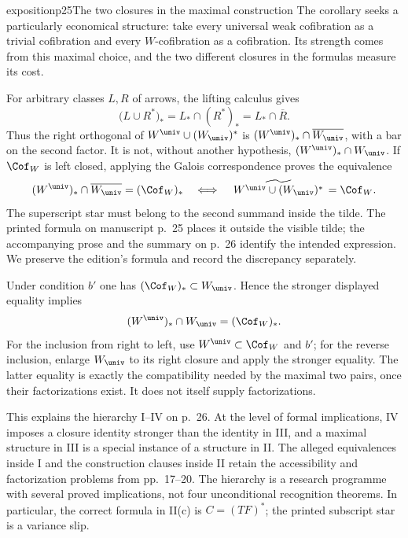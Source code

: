 \begin{dcomment}{exposition}{p25}{The two closures in the maximal construction}
The corollary seeks a particularly economical structure: take every universal weak cofibration as a trivial cofibration and every $W$-cofibration as a cofibration. Its strength comes from this maximal choice, and the two different closures in the formulas measure its cost.

For arbitrary classes $L,R$ of arrows, the lifting calculus gives
\[
 \bigl(L\cup R^*\bigr)_*=L_*\cap(R^*)_*
       =L_*\cap\overline R.
\]
Thus the right orthogonal of $W^{\univ}\cup(W_{\univ})^*$ is
$(W^{\univ})_*\cap\overline{W_{\univ}}$, with a bar on the second factor. It is not, without another hypothesis, $(W^{\univ})_*\cap W_{\univ}$. If $\Cof_W$ is left closed, applying the Galois correspondence proves the equivalence
\[
 (W^{\univ})_*\cap\overline{W_{\univ}}=(\Cof_W)_*
 \quad\Longleftrightarrow\quad
 \widetilde{\,W^{\univ}\cup(W_{\univ})^*\,}=\Cof_W.
\]
The superscript star must belong to the second summand inside the tilde. The printed formula on manuscript p.~25 places it outside the visible tilde; the accompanying prose and the summary on p.~26 identify the intended expression. We preserve the edition's formula and record the discrepancy separately.

Under condition $b'$ one has $(\Cof_W)_*\subset W_{\univ}$. Hence the stronger displayed equality implies
\[
 (W^{\univ})_*\cap W_{\univ}=(\Cof_W)_*.
\]
For the inclusion from right to left, use $W^{\univ}\subset\Cof_W$ and $b'$; for the reverse inclusion, enlarge $W_{\univ}$ to its right closure and apply the stronger equality. The latter equality is exactly the compatibility needed by the maximal two pairs, once their factorizations exist. It does not itself supply factorizations.

This explains the hierarchy I--IV on p.~26. At the level of formal implications, IV imposes a closure identity stronger than the identity in III, and a maximal structure in III is a special instance of a structure in II. The alleged equivalences inside I and the construction clauses inside II retain the accessibility and factorization problems from pp.~17--20. The hierarchy is a research programme with several proved implications, not four unconditional recognition theorems. In particular, the correct formula in II(c) is $C=(TF)^*$; the printed subscript star is a variance slip.
\end{dcomment}


